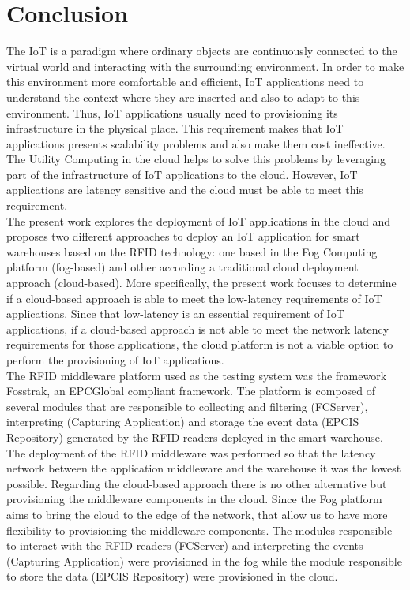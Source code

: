 
\chapter{Conclusion}
\label{chapter:conclusion}

The \acrfull{IoT} is a paradigm where ordinary objects are continuously connected to the virtual
world and interacting with the surrounding environment. In order to make this environment more comfortable and
efficient, \gls{IoT} applications need to understand the context where they are inserted and also to
adapt to this environment. Thus, \gls{IoT} applications usually need to provisioning its infrastructure
in the physical place. This requirement makes that \gls{IoT} applications presents scalability
problems and also make them cost ineffective. The Utility Computing in the cloud helps to solve this
problems by leveraging part of the infrastructure of \gls{IoT} applications to the cloud. However,
\gls{IoT} applications are latency sensitive and the cloud must be able to meet this requirement.\\

The present work explores the deployment of \gls{IoT} applications in the cloud and proposes
two different approaches to deploy an \gls{IoT} application for smart warehouses based on the
\gls{RFID} technology: one based in the Fog Computing platform (fog-based) and other according a traditional
cloud deployment approach (cloud-based). More specifically, the present work focuses to determine if a cloud-based
approach is able to meet the low-latency requirements of \gls{IoT} applications. Since that low-latency
is an essential requirement of \gls{IoT} applications, if a cloud-based approach is not able to meet the
network latency requirements for those applications, the cloud platform is not a viable option to perform
the provisioning of \gls{IoT} applications.\\

The \gls{RFID} middleware platform used as the testing system was the framework Fosstrak, an EPCGlobal
compliant framework. The platform is composed of several modules that are responsible to collecting
and filtering (FCServer), interpreting (Capturing Application) and storage the event data (EPCIS Repository)
generated by the \gls{RFID} readers deployed in the smart warehouse.\\

The deployment of the \gls{RFID} middleware was performed so that the latency network between the
application middleware and the warehouse it was the lowest possible. Regarding the cloud-based approach
there is no other alternative but provisioning the middleware components in the cloud. Since the Fog
platform aims to bring the cloud to the edge of the network, that allow us to have more flexibility
to provisioning the middleware components. The modules responsible to interact with the \gls{RFID}
readers (FCServer) and interpreting the events (Capturing Application) were provisioned in the fog while the module
responsible to store the data (EPCIS Repository) were provisioned in the cloud.\\

